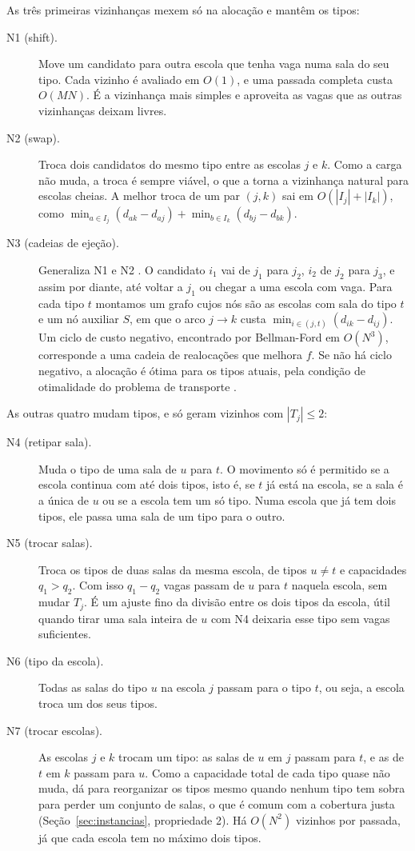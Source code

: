 \documentclass[12pt]{article}
\begin{document}
As três primeiras vizinhanças mexem só na alocação e mantêm os tipos:
\begin{description}
  \item[N1 (shift).] Move um candidato para outra escola que tenha vaga numa sala do seu tipo. Cada
    vizinho é avaliado em $O(1)$, e uma passada completa custa $O(MN)$. É a vizinhança mais
    simples e aproveita as vagas que as outras vizinhanças deixam livres.
  \item[N2 (swap).] Troca dois candidatos do mesmo tipo entre as escolas $j$ e $k$. Como a carga
    não muda, a troca é sempre viável, o que a torna a vizinhança natural para escolas cheias. A
    melhor troca de um par $(j,k)$ sai em $O(|I_j| + |I_k|)$, como
    $\min_{a \in I_j} (d_{ak} - d_{aj}) + \min_{b \in I_k} (d_{bj} - d_{bk})$.
  \item[N3 (cadeias de ejeção).] Generaliza N1 e N2 \cite{glover1996}. O candidato $i_1$ vai de
    $j_1$ para $j_2$, $i_2$ de $j_2$ para $j_3$, e assim por diante, até voltar a $j_1$ ou chegar a
    uma escola com vaga. Para cada tipo $t$ montamos um grafo cujos nós são as escolas com sala do
    tipo $t$ e um nó auxiliar $S$, em que o arco $j \to k$ custa
    $\min_{i \in (j,t)} (d_{ik} - d_{ij})$. Um ciclo de custo negativo, encontrado por
    Bellman-Ford em $O(N^3)$, corresponde a uma cadeia de realocações que melhora $f$. Se não há
    ciclo negativo, a alocação é ótima para os tipos atuais, pela condição de otimalidade do
    problema de transporte \cite{ahuja1993}.
\end{description}

As outras quatro mudam tipos, e só geram vizinhos com $|T_j| \le 2$:
\begin{description}
  \item[N4 (retipar sala).] Muda o tipo de uma sala de $u$ para $t$. O movimento só é permitido se
    a escola continua com até dois tipos, isto é, se $t$ já está na escola, se a sala é a única de
    $u$ ou se a escola tem um só tipo. Numa escola que já tem dois tipos, ele passa uma sala de um
    tipo para o outro.
  \item[N5 (trocar salas).] Troca os tipos de duas salas da mesma escola, de tipos $u \ne t$ e
    capacidades $q_1 > q_2$. Com isso $q_1 - q_2$ vagas passam de $u$ para $t$ naquela escola, sem
    mudar $T_j$. É um ajuste fino da divisão entre os dois tipos da escola, útil quando tirar uma
    sala inteira de $u$ com N4 deixaria esse tipo sem vagas suficientes.
  \item[N6 (tipo da escola).] Todas as salas do tipo $u$ na escola $j$ passam para o tipo $t$, ou
    seja, a escola troca um dos seus tipos.
  \item[N7 (trocar escolas).] As escolas $j$ e $k$ trocam um tipo: as salas de $u$ em $j$ passam
    para $t$, e as de $t$ em $k$ passam para $u$. Como a capacidade total de cada tipo quase não
    muda, dá para reorganizar os tipos mesmo quando nenhum tipo tem sobra para perder um conjunto
    de salas, o que é comum com a cobertura justa (Seção~\ref{sec:instancias}, propriedade 2). Há
    $O(N^2)$ vizinhos por passada, já que cada escola tem no máximo dois tipos.
\end{description}
\end{document}
